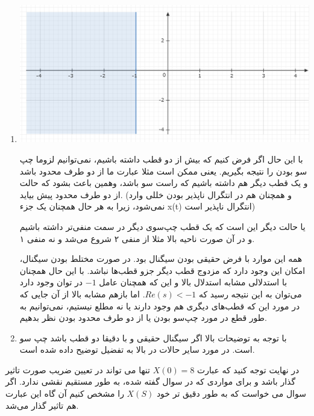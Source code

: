 \documentclass[12pt]{article}
\begin{document}
\begin{enumerate}[label = \Alph*)]
	
	\item

\begin{center}
	\includegraphics[width = 0.75 \textwidth]{images/1.png}
\end{center}



با این حال اگر فرض کنیم که بیش از دو قطب داشته باشیم، نمی‌توانیم لزوما چپ سو بودن را نتیجه بگیریم. یعنی ممکن است مثلا عبارت ما از دو طرف محدود باشد و یک قطب دیگر هم داشته باشیم که راست سو باشد،  وهمین باعث بشود که حالت از دو طرف محدود پیش بیاید. (و همچنان هم در انتگرال ناپذیر بودن خللی وارد نمی‌شود، زیرا به هر حال همچنان یک جزء x(t) انتگرال ناپذیر است)

یا حالت دیگر این است که یک قطب چپ‌سوی دیگر در سمت منفی‌تر داشته باشیم و در آن صورت ناحیه بالا مثلا از منفی ۲ شروع می‌شد و نه منفی ۱.


همه این موارد با فرض حقیقی بودن سیگنال بود. در صورت مختلط بودن سیگنال، امکان این وجود دارد که مزدوج قطب دیگر جزو قطب‌ها نباشد. با این حال همچنان با استدلالی مشابه استدلال بالا و این که همچنان عامل $-1$ در توان وجود دارد می‌توان به این نتیجه رسید که $Re(s)<-1$. اما باز‌هم مشابه بالا از آن جایی که در مورد این که قطب‌های دیگری هم وجود دارند یا نه مطلع نیستیم، نمی‌توانیم به طور قطع در مورد چپ‌سو بودن یا از دو طرف محدود بودن نظر بدهیم.


\item

با توجه به توضیحات بالا اگر سیگنال حقیقی و با دقیقا دو قطب باشد چپ سو است. در مورد سایر حالات در بالا به تفضیل توضیح داده شده است.
	
\end{enumerate}


در نهایت توجه کنید که عبارت $X(0)=8$
تنها می تواند در تعیین ضریب صورت تاثیر گذار باشد و برای مواردی که در سوال گفته شده، به طور مستقیم نقشی ندارد. اگر سوال می خواست که به طور دقیق تر خود $X(S)$ را مشخص کنیم آن گاه این عبارت هم تاثیر گذار می‌شد.
\end{document}
